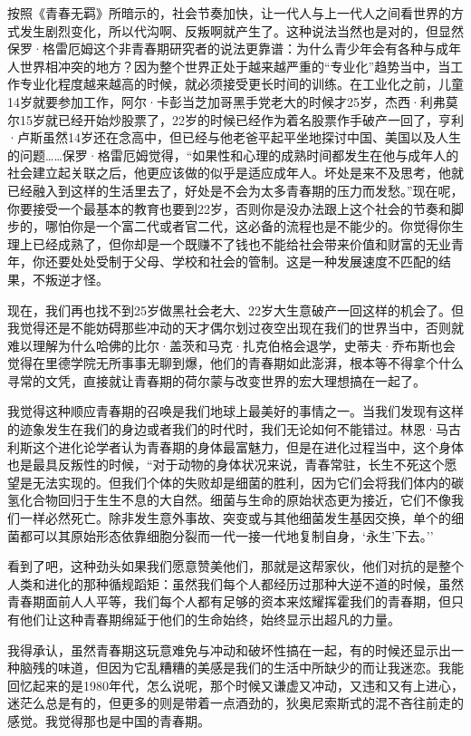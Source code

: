按照《青春无羁》所暗示的，社会节奏加快，让一代人与上一代人之间看世界的方式发生剧烈变化，所以代沟啊、反叛啊就产生了。这种说法当然也是对的，但显然保罗·格雷厄姆这个非青春期研究者的说法更靠谱：为什么青少年会有各种与成年人世界相冲突的地方？因为整个世界正处于越来越严重的``专业化''趋势当中，当工作专业化程度越来越高的时候，就必须接受更长时间的训练。在工业化之前，儿童14岁就要参加工作，阿尔·卡彭当芝加哥黑手党老大的时候才25岁，杰西·利弗莫尔15岁就已经开始炒股票了，22岁的时候已经作为着名股票作手破产一回了，亨利·卢斯虽然14岁还在念高中，但已经与他老爸平起平坐地探讨中国、美国以及人生的问题\ldots{}\ldots{}保罗·格雷厄姆觉得，``如果性和心理的成熟时间都发生在他与成年人的社会建立起关联之后，他更应该做的似乎是适应成年人。坏处是来不及思考，他就已经融入到这样的生活里去了，好处是不会为太多青春期的压力而发愁。''现在呢，你要接受一个最基本的教育也要到22岁，否则你是没办法跟上这个社会的节奏和脚步的，哪怕你是一个富二代或者官二代，这必备的流程也是不能少的。你觉得你生理上已经成熟了，但你却是一个既赚不了钱也不能给社会带来价值和财富的无业青年，你还要处处受制于父母、学校和社会的管制。这是一种发展速度不匹配的结果，不叛逆才怪。

现在，我们再也找不到25岁做黑社会老大、22岁大生意破产一回这样的机会了。但我觉得还是不能妨碍那些冲动的天才偶尔划过夜空出现在我们的世界当中，否则就难以理解为什么哈佛的比尔·盖茨和马克·扎克伯格会退学，史蒂夫·乔布斯也会觉得在里德学院无所事事无聊到爆，他们的青春期如此澎湃，根本等不得拿个什么寻常的文凭，直接就让青春期的荷尔蒙与改变世界的宏大理想搞在一起了。

我觉得这种顺应青春期的召唤是我们地球上最美好的事情之一。当我们发现有这样的迹象发生在我们的身边或者我们的时代时，我们无论如何不能错过。林恩·马古利斯这个进化论学者认为青春期的身体最富魅力，但是在进化过程当中，这个身体也是最具反叛性的时候，``对于动物的身体状况来说，青春常驻，长生不死这个愿望是无法实现的。但我们个体的失败却是细菌的胜利，因为它们会将我们体内的碳氢化合物回归于生生不息的大自然。细菌与生命的原始状态更为接近，它们不像我们一样必然死亡。除非发生意外事故、突变或与其他细菌发生基因交换，单个的细菌都可以其原始形态依靠细胞分裂而一代一接一代地复制自身，`永生'下去。''

看到了吧，这种劲头如果我们愿意赞美他们，那就是这帮家伙，他们对抗的是整个人类和进化的那种循规蹈矩：虽然我们每个人都经历过那种大逆不道的时候，虽然青春期面前人人平等，我们每个人都有足够的资本来炫耀挥霍我们的青春期，但只有他们让这种青春期绵延于他们的生命始终，始终显示出超凡的力量。

我得承认，虽然青春期这玩意难免与冲动和破坏性搞在一起，有的时候还显示出一种脑残的味道，但因为它乱糟糟的美感是我们的生活中所缺少的而让我迷恋。我能回忆起来的是1980年代，怎么说呢，那个时候又谦虚又冲动，又违和又有上进心，迷茫么总是有的，但更多的则是带着一点酒劲的，狄奥尼索斯式的混不吝往前走的感觉。我觉得那也是中国的青春期。

